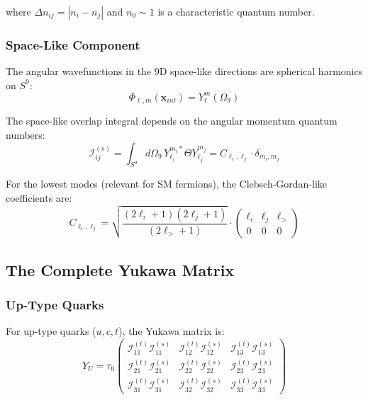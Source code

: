 where $\Delta n_{ij} = |n_i - n_j|$ and $n_0 \sim 1$ is a characteristic quantum number.

\subsubsection{Space-Like Component}

The angular wavefunctions in the 9D space-like directions are spherical harmonics on $S^9$:
\begin{equation}
    \Phi_{\ell,m}(\mathbf{x}_{int}) = Y_{\ell}^{m}(\Omega_9)
\end{equation}

The space-like overlap integral depends on the angular momentum quantum numbers:
\begin{equation}
    \mathcal{I}_{ij}^{(s)} = \int_{S^9} d\Omega_9 \, Y_{\ell_i}^{m_i*} \Theta Y_{\ell_j}^{m_j} = C_{\ell_i, \ell_j} \cdot \delta_{m_i, m_j}
\end{equation}

For the lowest modes (relevant for SM fermions), the Clebsch-Gordan-like coefficients are:
\begin{equation}
    C_{\ell_i, \ell_j} = \sqrt{\frac{(2\ell_i+1)(2\ell_j+1)}{(2\ell_>+1)}} \cdot \begin{pmatrix} \ell_i & \ell_j & \ell_> \\ 0 & 0 & 0 \end{pmatrix}
\end{equation}

\subsection{The Complete Yukawa Matrix}

\subsubsection{Up-Type Quarks}

For up-type quarks ($u, c, t$), the Yukawa matrix is:
\begin{equation}
    Y_U = \tau_0 \begin{pmatrix}
        \mathcal{I}_{11}^{(t)} \mathcal{I}_{11}^{(s)} & \mathcal{I}_{12}^{(t)} \mathcal{I}_{12}^{(s)} & \mathcal{I}_{13}^{(t)} \mathcal{I}_{13}^{(s)} \\
        \mathcal{I}_{21}^{(t)} \mathcal{I}_{21}^{(s)} & \mathcal{I}_{22}^{(t)} \mathcal{I}_{22}^{(s)} & \mathcal{I}_{23}^{(t)} \mathcal{I}_{23}^{(s)} \\
        \mathcal{I}_{31}^{(t)} \mathcal{I}_{31}^{(s)} & \mathcal{I}_{32}^{(t)} \mathcal{I}_{32}^{(s)} & \mathcal{I}_{33}^{(t)} \mathcal{I}_{33}^{(s)}
    \end{pmatrix}
\end{equation}

